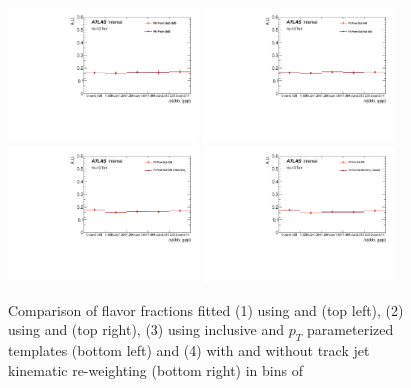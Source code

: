 \begin{figure}[htbp]
  \centering
 \includegraphics[width=0.45\textwidth]{figures/gbb/Sub_Sd0_Fits/Canv_dphi_leadCrossCheck.pdf}
 \includegraphics[width=0.45\textwidth]{figures/gbb/Sub_Sd0_Fits/Canv_dphi_subsubCrossCheck.pdf}\\
 \includegraphics[width=0.45\textwidth]{figures/gbb/Sub_Sd0_Fits/Canv_dphi_ptbinCrossCheck.pdf}
 \includegraphics[width=0.45\textwidth]{figures/gbb/Sub_Sd0_Fits/Canv_dphi_noreweightCrossCheck.pdf}\\
\caption{Comparison of flavor fractions fitted (1) using \subsdzero and \sdzero (top left), (2) using \subsdzero and \subsubsdzero (top right), (3) using inclusive and $p_T$ parameterized templates (bottom left) and (4) with and without track jet kinematic re-weighting (bottom right) in bins of \dphi}
  \label{fig:dphi-fitfrac-crosscheck}
\end{figure}


\clearpage

